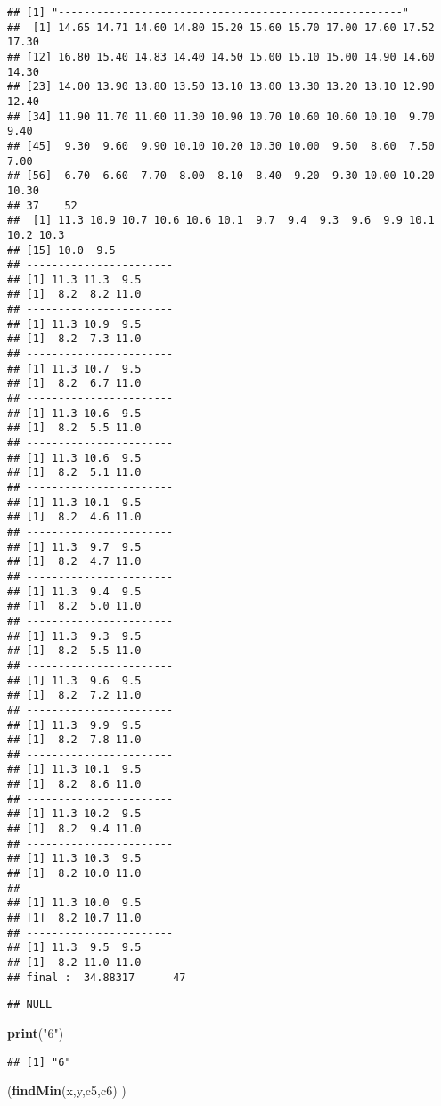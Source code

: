 \documentclass[]{article}
\newenvironment{Shaded}{\begin{snugshade}}{\end{snugshade}}
\newcommand{\KeywordTok}[1]{\textcolor[rgb]{0.13,0.29,0.53}{\textbf{#1}}}
\newcommand{\StringTok}[1]{\textcolor[rgb]{0.31,0.60,0.02}{#1}}
\newcommand{\NormalTok}[1]{#1}
\begin{document}
\begin{verbatim}
## [1] "------------------------------------------------------"
##  [1] 14.65 14.71 14.60 14.80 15.20 15.60 15.70 17.00 17.60 17.52 17.30
## [12] 16.80 15.40 14.83 14.40 14.50 15.00 15.10 15.00 14.90 14.60 14.30
## [23] 14.00 13.90 13.80 13.50 13.10 13.00 13.30 13.20 13.10 12.90 12.40
## [34] 11.90 11.70 11.60 11.30 10.90 10.70 10.60 10.60 10.10  9.70  9.40
## [45]  9.30  9.60  9.90 10.10 10.20 10.30 10.00  9.50  8.60  7.50  7.00
## [56]  6.70  6.60  7.70  8.00  8.10  8.40  9.20  9.30 10.00 10.20 10.30
## 37    52 
##  [1] 11.3 10.9 10.7 10.6 10.6 10.1  9.7  9.4  9.3  9.6  9.9 10.1 10.2 10.3
## [15] 10.0  9.5
## -----------------------
## [1] 11.3 11.3  9.5
## [1]  8.2  8.2 11.0
## -----------------------
## [1] 11.3 10.9  9.5
## [1]  8.2  7.3 11.0
## -----------------------
## [1] 11.3 10.7  9.5
## [1]  8.2  6.7 11.0
## -----------------------
## [1] 11.3 10.6  9.5
## [1]  8.2  5.5 11.0
## -----------------------
## [1] 11.3 10.6  9.5
## [1]  8.2  5.1 11.0
## -----------------------
## [1] 11.3 10.1  9.5
## [1]  8.2  4.6 11.0
## -----------------------
## [1] 11.3  9.7  9.5
## [1]  8.2  4.7 11.0
## -----------------------
## [1] 11.3  9.4  9.5
## [1]  8.2  5.0 11.0
## -----------------------
## [1] 11.3  9.3  9.5
## [1]  8.2  5.5 11.0
## -----------------------
## [1] 11.3  9.6  9.5
## [1]  8.2  7.2 11.0
## -----------------------
## [1] 11.3  9.9  9.5
## [1]  8.2  7.8 11.0
## -----------------------
## [1] 11.3 10.1  9.5
## [1]  8.2  8.6 11.0
## -----------------------
## [1] 11.3 10.2  9.5
## [1]  8.2  9.4 11.0
## -----------------------
## [1] 11.3 10.3  9.5
## [1]  8.2 10.0 11.0
## -----------------------
## [1] 11.3 10.0  9.5
## [1]  8.2 10.7 11.0
## -----------------------
## [1] 11.3  9.5  9.5
## [1]  8.2 11.0 11.0
## final :  34.88317      47
\end{verbatim}

\begin{verbatim}
## NULL
\end{verbatim}

\begin{Shaded}
\begin{Highlighting}[]
\KeywordTok{print}\NormalTok{(}\StringTok{"6"}\NormalTok{)}
\end{Highlighting}
\end{Shaded}

\begin{verbatim}
## [1] "6"
\end{verbatim}

\begin{Shaded}
\begin{Highlighting}[]
\NormalTok{(}\KeywordTok{findMin}\NormalTok{(x,y,c5,c6) )}
\end{Highlighting}
\end{Shaded}
\end{document}
